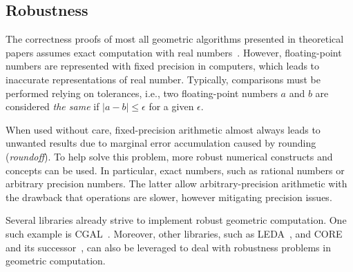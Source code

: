 \subsection{Robustness}%
\label{sec:related.robustness}

The correctness proofs of most all geometric algorithms presented in theoretical
papers assumes exact computation with real numbers~\cite{CGAL:4.13:23LGK}.
However, floating-point numbers are represented with fixed precision in
computers, which leads to inaccurate representations of real number.  Typically,
comparisons must be performed relying on tolerances, i.e., two floating-point
numbers $a$ and $b$ are considered \textit{the same} if $|a - b| \le \epsilon$
for a given $\epsilon$.

When used without care, fixed-precision arithmetic almost always leads to
unwanted results due to marginal error accumulation caused by rounding
(\textit{roundoff}).  To help solve this problem, more robust numerical
constructs and concepts can be used.  In particular, exact numbers, such as
rational numbers or arbitrary precision numbers. The latter allow
arbitrary-precision arithmetic with the drawback that operations are slower,
however mitigating precision issues.

Several libraries already strive to implement robust geometric computation.  One
such example is \ac{CGAL}~\cite{CGAL:5.3:Project}.  Moreover, other libraries,
such as \ac{LEDA}~\cite{Mehlhorn:1989:LEDA}, and
CORE~\cite{Karamcheti:1999:CLRNGC} and its successor~\cite{Yu:2010:CORE2}, can
also be leveraged to deal with robustness problems in geometric computation.
